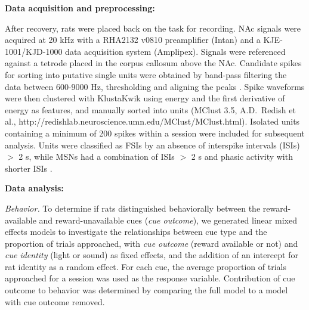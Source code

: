 \documentclass[11pt]{article}
\let\cite=\citep
\begin{document}
{\bf Data acquisition and preprocessing:}

After recovery, rats were placed back on the task for recording. NAc
signals were acquired at 20 kHz with a RHA2132 v0810 preamplifier
(Intan) and a KJE-1001/KJD-1000 data acquisition system
(Amplipex). Signals were referenced against a tetrode placed in the
corpus callosum above the NAc. Candidate spikes for sorting into
putative single units were obtained by band-pass filtering the data
between 600-9000 Hz, thresholding and aligning the peaks \cite[UltraMegaSort2k, ][]{Hill2011}. Spike waveforms were then
clustered with KlustaKwik using energy and the first derivative of
energy as features, and manually sorted into units (MClust 3.5,
A.D.\ Redish et al., http://redishlab.neuroscience.umn.edu/MClust/MClust.html). Isolated units containing a minimum of 200
spikes within a session were included for subsequent analysis. Units
were classified as FSIs by an absence of
interspike intervals (ISIs) $>$ 2 s, while MSNs
had a combination of ISIs $>$ 2 s and phasic activity with shorter
ISIs \cite{Barnes2005,Atallah2014}.

{\bf Data analysis:}

{\it Behavior.} To determine if rats distinguished behaviorally
between the reward-available and reward-unavailable cues ({\it cue
outcome}), we generated linear mixed effects models to investigate
the relationships between cue type and the proportion of trials approached, with
{\it cue outcome} (reward available or not) and {\it cue identity}
(light or sound) as fixed effects, and the addition of an intercept
for rat identity as a random effect. For each cue, the average
proportion of trials approached for a session was
used as the response variable. Contribution of cue outcome to behavior
was determined by comparing the full model to a model with cue outcome
removed.
\end{document}
